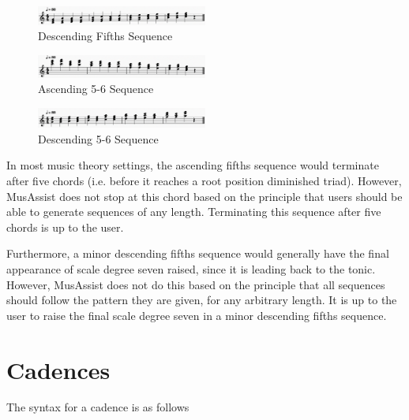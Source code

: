\documentclass{report}
\begin{document}
\begin{figure}[h!]
\centering
\includegraphics[width=0.5\textwidth]{images/descfifths}
  \caption{Descending Fifths Sequence}
\end{figure}

\begin{figure}[h!]
\centering
\includegraphics[width=0.5\textwidth]{images/asc56}
  \caption{Ascending 5-6 Sequence}
\end{figure}

\begin{figure}[h!]
\centering
\includegraphics[width=0.5\textwidth]{images/desc56}
  \caption{Descending 5-6 Sequence}
  \label{fig:desc56}
\end{figure}

\newpage

In most music theory settings, the ascending fifths sequence would terminate after five chords (i.e. before it reaches a root position diminished  triad). However, MusAssist does not stop at this chord based on the principle that users should be able to generate sequences of any length. Terminating this sequence after five chords is up to the user.

Furthermore, a minor descending fifths sequence would generally have the final appearance of scale degree seven raised, since it is leading back to the tonic. However, MusAssist does not do this based on the principle that all sequences should follow the pattern they are given, for any arbitrary length. It is up to the user to raise the final scale degree seven in a minor descending fifths sequence.


\section{Cadences}

The syntax for a cadence is as follows
\end{document}
